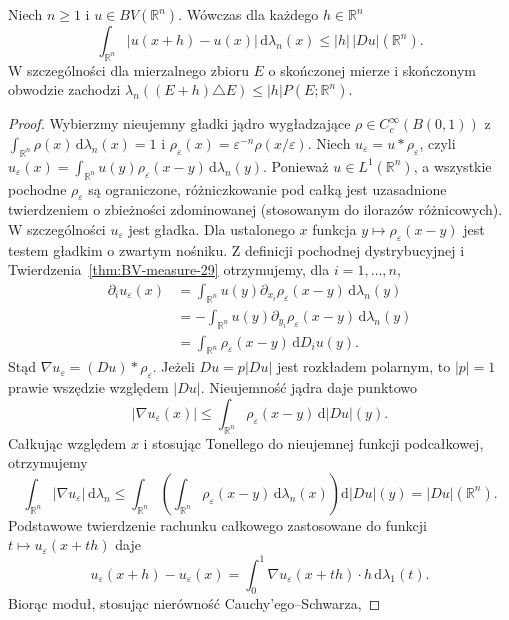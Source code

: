 \begin{lemat}
\label{lem:BV-translation-29}
Niech $n\ge1$ i $u\in BV(\mathbb R^n)$.
Wówczas dla każdego $h\in\mathbb R^n$
\[
 \int_{\mathbb R^n}|u(x+h)-u(x)|
 \,\mathrm d\lambda_n(x)\le|h|\,|Du|(\mathbb R^n).
\]
W szczególności dla mierzalnego zbioru $E$ o
skończonej mierze i skończonym obwodzie zachodzi
$\lambda_n((E+h)\triangle E)\le|h|P(E;\mathbb R^n)$.
\end{lemat}
\begin{proof}
Wybierzmy nieujemny gładki jądro wygładzające
$\rho\in C_c^\infty(B(0,1))$ z
$\int_{\mathbb R^n}\rho(x)\,\mathrm d\lambda_n(x)=1$ i
$\rho_\varepsilon(x)=\varepsilon^{-n}\rho(x/\varepsilon)$.
Niech $u_\varepsilon=u*\rho_\varepsilon$, czyli
$u_\varepsilon(x)=\int_{\mathbb R^n}u(y)
\rho_\varepsilon(x-y)\,\mathrm d\lambda_n(y)$.
Ponieważ $u\in L^1(\mathbb R^n)$, a wszystkie
pochodne $\rho_\varepsilon$ są ograniczone,
różniczkowanie pod całką jest uzasadnione
twierdzeniem o zbieżności zdominowanej
(stosowanym do ilorazów różnicowych).
W szczególności $u_\varepsilon$ jest gładka.
Dla ustalonego $x$ funkcja
$y\mapsto\rho_\varepsilon(x-y)$ jest testem gładkim
o zwartym nośniku. Z definicji pochodnej
dystrybucyjnej i Twierdzenia~\ref{thm:BV-measure-29}
otrzymujemy, dla $i=1,\ldots,n$,
\begin{align*}
 \partial_i u_\varepsilon(x)
 &=\int_{\mathbb R^n}u(y)
 \partial_{x_i}\rho_\varepsilon(x-y)\,\mathrm d\lambda_n(y)\\
 &=-\int_{\mathbb R^n}u(y)
 \partial_{y_i}\rho_\varepsilon(x-y)\,\mathrm d\lambda_n(y)\\
 &=\int_{\mathbb R^n}\rho_\varepsilon(x-y)\,\mathrm dD_i u(y).
\end{align*}
Stąd $\nabla u_\varepsilon=(Du)*\rho_\varepsilon$.
Jeżeli $Du=p|Du|$ jest rozkładem polarnym, to
$|p|=1$ prawie wszędzie względem $|Du|$.
Nieujemność jądra daje punktowo
\[
 |\nabla u_\varepsilon(x)|
 \le\int_{\mathbb R^n}\rho_\varepsilon(x-y)\,\mathrm d|Du|(y).
\]
Całkując względem $x$ i stosując Tonellego do
nieujemnej funkcji podcałkowej, otrzymujemy
\[
 \int_{\mathbb R^n}|\nabla u_\varepsilon|\,\mathrm d\lambda_n
 \le\int_{\mathbb R^n}
 \left(\int_{\mathbb R^n}\rho_\varepsilon(x-y)
 \,\mathrm d\lambda_n(x)\right)\mathrm d|Du|(y)
 =|Du|(\mathbb R^n).
\]
Podstawowe twierdzenie rachunku całkowego zastosowane
do funkcji $t\mapsto u_\varepsilon(x+th)$ daje
\[
 u_\varepsilon(x+h)-u_\varepsilon(x)
 =\int_0^1\nabla u_\varepsilon(x+th)\cdot h
 \,\mathrm d\lambda_1(t).
\]
Biorąc moduł, stosując nierówność Cauchy'ego--Schwarza,

\end{proof}
